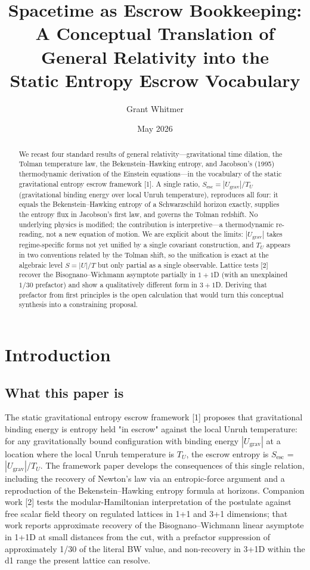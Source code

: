 \documentclass[11pt]{article}
\title{Spacetime as Escrow Bookkeeping:\\[2pt]
\large A Conceptual Translation of General Relativity into the\\ Static Entropy Escrow Vocabulary}
\author{Grant Whitmer}
\date{May 2026}
\begin{document}
\maketitle
\begin{abstract}
We recast four standard results of general relativity---gravitational time dilation, the Tolman temperature law, the Bekenstein--Hawking entropy, and Jacobson's (1995) thermodynamic derivation of the Einstein equations---in the vocabulary of the static gravitational entropy escrow framework [1]. A single ratio, $S_{\mathrm{esc}} = |U_{\mathrm{grav}}|/T_U$ (gravitational binding energy over local Unruh temperature), reproduces all four: it equals the Bekenstein--Hawking entropy of a Schwarzschild horizon exactly, supplies the entropy flux in Jacobson's first law, and governs the Tolman redshift. No underlying physics is modified; the contribution is interpretive---a thermodynamic re-reading, not a new equation of motion. We are explicit about the limits: $|U_{\mathrm{grav}}|$ takes regime-specific forms not yet unified by a single covariant construction, and $T_U$ appears in two conventions related by the Tolman shift, so the unification is exact at the algebraic level $S = |U|/T$ but only partial as a single observable. Lattice tests [2] recover the Bisognano--Wichmann asymptote partially in $1{+}1$D (with an unexplained $1/30$ prefactor) and show a qualitatively different form in $3{+}1$D. Deriving that prefactor from first principles is the open calculation that would turn this conceptual synthesis into a constraining proposal.
\end{abstract}

\section{Introduction}


\subsection{What this paper is}

The static gravitational entropy escrow framework [1] proposes that
gravitational binding energy is entropy held "in escrow" against the
local Unruh temperature: for any gravitationally bound configuration
with binding energy $|U_{\mathrm{grav}}|$ at a location where the local Unruh
temperature is $T_{U}$, the escrow entropy is $S_{\mathrm{esc}}$ = $|U_{\mathrm{grav}}|$/$T_{U}$. The
framework paper develops the consequences of this single relation,
including the recovery of Newton's law via an entropic-force argument
and a reproduction of the Bekenstein--Hawking entropy formula at
horizons. Companion work [2] tests the modular-Hamiltonian
interpretation of the postulate against free scalar field theory on
regulated lattices in 1+1 and 3+1 dimensions; that work reports
approximate recovery of the Bisognano--Wichmann linear asymptote in 1+1D
at small distances from the cut, with a prefactor suppression of
approximately 1/30 of the literal BW value, and non-recovery in 3+1D
within the d1 range the present lattice can resolve.
\end{document}

